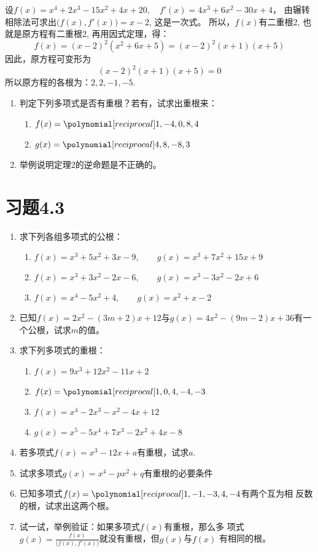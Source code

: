 \begin{solution}
 设$f(x)=x^4+2x^3-15x^2+4x+20,\quad 
f' (x) =4x^3+6x^2-30x+4$，
由辗转相除法可求出$\big(f(x),f'(x)\big)=x-2$, 这是一次式。
所以，$f(x)$有二重根2, 也就是原方程有二重根2, 再用因式定理，得：
\[f (x) = (x-2)^2  (x^2+6x+5)= (x-2)^2 (x+1)(x+5)\]
因此，原方程可变形为
\[(x-2)^2 (x+1)(x+5)=0\]
所以原方程的各根为：$2, 2,-1,-5$.   
\end{solution}

\begin{ex}
    \begin{enumerate}
        \item 判定下列多项式是否有重根？若有，试求出重根来：
\begin{enumerate}
    \item $f(x)=\poly{1,-4,0,8,4}$
    \item $g(x)=\poly{4,8,-8,3}$
\end{enumerate}
        \item 举例说明定理2的逆命题是不正确的。
    \end{enumerate}
\end{ex}

\section*{习题4.3}
\begin{enumerate}
\item 求下列各组多项式的公根：
\begin{enumerate}
    \item $f (x) =x^3+5x^2+3x-9,\qquad 
g (x) =x^3+7x^2+15x+9$
\item $f (x) =x^3+3x^2-2x-6,\qquad 
g (x) =x^3-3x^2-2x+6$
\item  $f (x) =x^4-5x^2+4,\qquad g (x) =x^2+x-2$
\end{enumerate}


\item 已知$f(x)=2x^2-(3m+2)x+12$与$g(x)=4x^2-(9m-2)x+36$有一个公根，试求$m$的值。
\item 求下列多项式的重根：
\begin{enumerate}
    \item $f (x) =9x^3+12x^2-11x+2$
    \item $f(x)=\poly{1,0,4,-4,-3}$
    \item $f (x) =x^4-2x^3-x^2-4x+12$
    \item $g (x) =x^5-5x^4+7x^3-2x^2+4x-8$
\end{enumerate}

\item 若多项式$f(x)=x^3-12x+a$有重根，试求$a$.
\item 试求多项式$g(x)=x^4-px^2+q$有重根的必要条件
\item 已知多项式$f(x)=\poly{1,-1,-3,4,-4}$有两个互为相
反数的根，试求出这两个根。
\item 试一试，举例验证：如果多项式$f(x)$有重根，那么多
项式$g(x)=\frac{f(x)}{\bigl(f (x) ,f' (x)\bigr)}$就没有重根，但$g(x)$与$f(x)$
有相同的根。
\end{enumerate}


